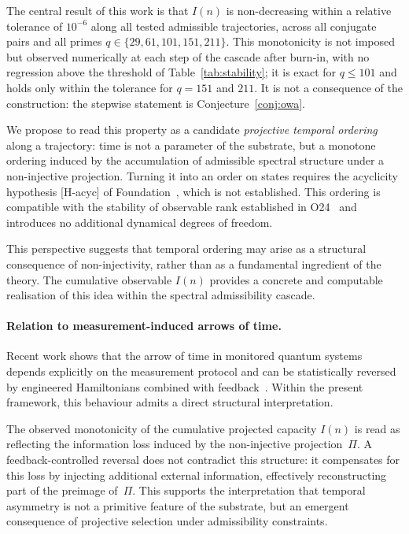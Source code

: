 \documentclass[11pt,a4paper]{article}
\begin{document}
  The central result of this work is that $I(n)$ is
  non-decreasing within a relative tolerance of $10^{-6}$ along all tested admissible
  trajectories, across all conjugate pairs and all primes $q \in \{29, 61, 101, 151, 211\}$.
  This monotonicity is not imposed but observed numerically at each step
  of the cascade after burn-in, with no regression above the threshold of
  Table~\ref{tab:stability}; it is exact for $q \leq 101$ and holds only within the
  tolerance for $q = 151$ and $211$.
  It is not a consequence of the construction: the stepwise statement is
  Conjecture~\ref{conj:owa}.

  We propose to read this property as a candidate \emph{projective temporal
  ordering} along a trajectory: time is not a parameter of the substrate, but a monotone
  ordering induced by the accumulation of admissible spectral structure
  under a non-injective projection.
  Turning it into an order on states requires the acyclicity hypothesis
  [H-acyc] of Foundation~\cite{Beau2026m}, which is not established.
  This ordering is compatible with the stability of observable rank
  established in O24~\cite{Beau2026a28} and introduces no additional
  dynamical degrees of freedom.

  This perspective suggests that temporal ordering may arise as a
  structural consequence of non-injectivity, rather than as a fundamental
  ingredient of the theory.
  The cumulative observable $I(n)$ provides a concrete and computable
  realisation of this idea within the spectral admissibility cascade.

  \paragraph{Relation to measurement-induced arrows of time.}
    Recent work shows that the arrow of time in monitored quantum systems
    depends explicitly on the measurement protocol and can be statistically
    reversed by engineered Hamiltonians combined with feedback~\cite{garcia-pintos2026arrow}.
    Within the present framework, this behaviour admits a direct structural
    interpretation.

    The observed monotonicity of the cumulative projected capacity $I(n)$ is read as reflecting
    the information loss induced by the non-injective projection~$\Pi$.
    A feedback-controlled reversal does not contradict this structure:
    it compensates for this loss by injecting additional external information,
    effectively reconstructing part of the preimage of~$\Pi$.
    This supports the interpretation that temporal asymmetry is not a primitive
    feature of the substrate, but an emergent consequence of projective
    selection under admissibility constraints.
\end{document}
